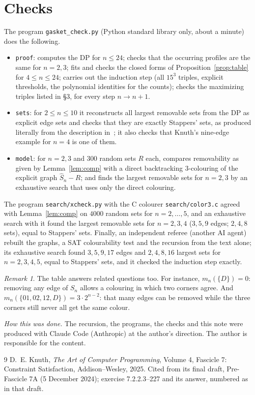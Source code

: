 \documentclass[11pt]{amsart}
\theoremstyle{remark}
\newtheorem{remark}[theorem]{Remark}
\newcommand{\Sh}{\widehat S}
\begin{document}
\section{Checks}\label{sec:check}
The program \texttt{gasket\_check.py} (Python standard library only, about a minute) does the following.
\begin{itemize}
\item \texttt{proof}: computes the DP for $n\le24$; checks that the occurring profiles are the same for $n=2,3$; fits
and checks the closed forms of Proposition~\ref{prop:table} for $4\le n\le24$; carries out the induction step
(all $15^3$ triples, explicit thresholds, the polynomial identities for the counts); checks the maximizing
triples listed in \S3, for every step $n\to n+1$.
\item \texttt{sets}: for $2\le n\le10$ it reconstructs all largest removable sets from the DP as explicit edge
sets and checks that they are exactly Stappers' sets, as produced literally from the description in~\cite{knuth7};
it also checks that Knuth's nine-edge example for $n=4$ is one of them.
\item \texttt{model}: for $n=2,3$ and $300$ random sets $R$ each, compares removability as given by
Lemma~\ref{lem:comp} with a direct backtracking $3$-colouring of the explicit graph $\Sh_n-R$; and finds the largest
removable sets for $n=2,3$ by an exhaustive search that uses only the direct colouring.
\end{itemize}
The program \texttt{search/xcheck.py} with the C colourer \texttt{search/color3.c} agreed with
Lemma~\ref{lem:comp} on $4000$ random sets for $n=2,\dots,5$, and an exhaustive search with it found the largest
removable sets for $n=2,3,4$ ($3,5,9$ edges; $2,4,8$ sets), equal to Stappers' sets. Finally, an independent referee
(another AI agent) rebuilt the graphs, a SAT colourability test and the recursion from the text alone; its
exhaustive search found $3,5,9,17$ edges and $2,4,8,16$ largest sets for $n=2,3,4,5$, equal to Stappers' sets, and
it checked the induction step exactly.

\begin{remark}
The table answers related questions too. For instance, $m_n(\{D\})=0$: removing any edge of $S_n$ allows a
colouring in which two corners agree. And $m_n(\{01,02,12,D\})=3\cdot2^{n-2}$: that many edges can be removed
while the three corners still never all get the same colour.
\end{remark}

\medskip\noindent\emph{How this was done.} The recursion, the programs, the checks and this note were produced
with Claude Code (Anthropic) at the author's direction. The author is responsible for the content.

\begin{thebibliography}{9}
 D.~E. Knuth, \emph{The Art of Computer Programming}, Volume 4, Fascicle 7: Constraint
Satisfaction, Addison--Wesley, 2025. Cited from its final draft, Pre-Fascicle 7A (5 December 2024); exercise
7.2.2.3--227 and its answer, numbered as in that draft.
\end{thebibliography}
\end{document}
